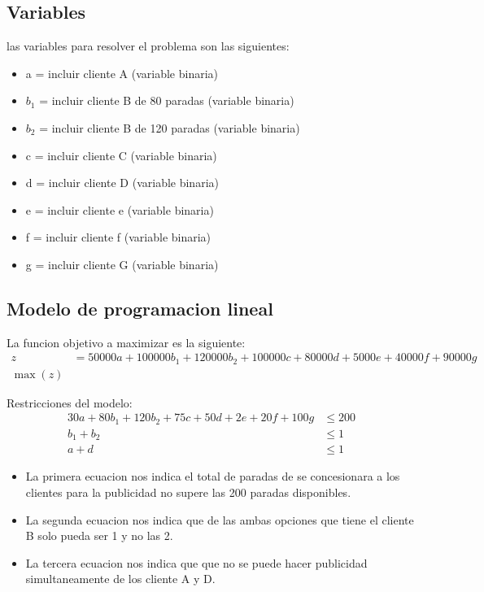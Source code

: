 \documentclass[a4paper, 12pt]{article}
\begin{document}
\subsection{Variables}
    las variables para resolver el problema son las siguientes:
\begin{itemize}
    \item a = incluir cliente A (variable binaria)
    \item $b_1$ = incluir cliente B de 80 paradas (variable binaria)
    \item $b_2$ = incluir cliente B de 120 paradas (variable binaria)
    \item c = incluir cliente C (variable binaria)
    \item d = incluir cliente D (variable binaria)
    \item e = incluir cliente e (variable binaria)
    \item f = incluir cliente f (variable binaria)
    \item g = incluir cliente G (variable binaria)
\end{itemize}

\subsection{Modelo de programacion lineal}
    La funcion objetivo a maximizar es la siguiente:
\begin{align*}
    z &= 50000a + 100000b_1 + 120000b_2 + 100000c + 80000d + 5000e + 40000f + 90000g \\
    \max(z)
\end{align*}

Restricciones del modelo:
\begin{align*}
    30a + 80b_1 + 120b_2 + 75c + 50d + 2e + 20f + 100g &\leq 200 \\
    b_1 + b_2 &\leq 1 \\
    a + d &\leq 1
\end{align*}
\begin{itemize}
    \item La primera ecuacion nos indica el total de paradas de se concesionara a los clientes para la publicidad no supere las 200 paradas disponibles.
    \item La segunda ecuacion nos indica que de las ambas opciones que tiene el cliente B solo pueda ser 1 y no las 2.
    \item La tercera ecuacion nos indica que que no se puede hacer publicidad simultaneamente de los cliente A y D.
    
\end{itemize}
\end{document}
